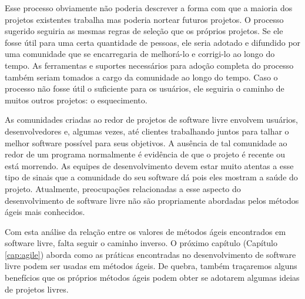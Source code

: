 Esse processo obviamente não poderia descrever a forma com que a
maioria dos projetos existentes trabalha mas poderia nortear futuros
projetos. O processo sugerido seguiria as mesmas regras de seleção que
os próprios projetos. Se ele fosse útil para uma certa quantidade de
pessoas, ele seria adotado e difundido por uma comunidade que se
encarregaria de melhorá-lo e corrigi-lo ao longo do tempo. As
ferramentas e suportes necessários para adoção completa do processo
também seriam tomados a cargo da comunidade ao longo do tempo. Caso o
processo não fosse útil o suficiente para os usuários, ele seguiria o
caminho de muitos outros projetos: o esquecimento.

As comunidades criadas ao redor de projetos de software livre envolvem
usuários, desenvolvedores e, algumas vezes, até clientes trabalhando
juntos para talhar o melhor software possível para seus objetivos. A
ausência de tal comunidade ao redor de um programa normalmente é
evidência de que o projeto é recente ou está morrendo. As equipes de
desenvolvimento devem estar muito atentas a esse tipo de sinais que a
comunidade do seu software dá pois eles mostram a saúde do
projeto. Atualmente, preocupações relacionadas a esse aspecto do
desenvolvimento de software livre não são propriamente abordadas pelos
métodos ágeis mais conhecidos.

Com esta análise da relação entre os valores de métodos ágeis
encontrados em software livre, falta seguir o caminho inverso. O
próximo capítulo (Capítulo \ref{cap:agile}) aborda como as
práticas encontradas no desenvolvimento de software livre podem ser
usadas em métodos ágeis. De quebra, também traçaremos alguns
benefícios que os próprios métodos ágeis podem obter se adotarem
algumas ideias de projetos livres.
